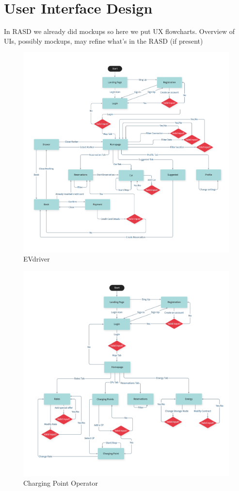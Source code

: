 \section{User Interface Design}
In RASD we already did mockups so here we put UX flowcharts.
Overview of UIs, possibly mockups, may refine what's in the RASD (if present)

\begin{figure}[H]
    \centering
    \includegraphics[scale=0.41]{src/UIDesign/User.pdf}
    \caption{EVdriver}
\end{figure} \vspace{1cm}

\begin{figure}[H]
    \centering
    \includegraphics[scale=0.41]{src/UIDesign/Cpo.pdf}
    \caption{Charging Point Operator}
\end{figure} \vspace{1cm}